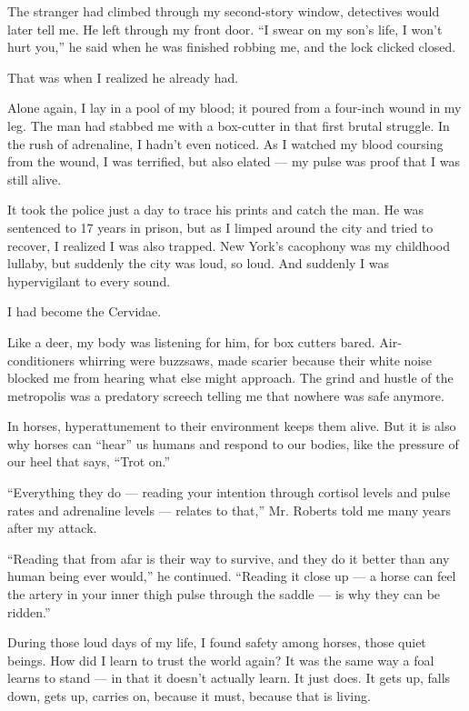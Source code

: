 The stranger had climbed through my second-story window, detectives
would later tell me. He left through my front door. ``I swear on my
son's life, I won't hurt you,'' he said when he was finished robbing me,
and the lock clicked closed.

That was when I realized he already had.

Alone again, I lay in a pool of my blood; it poured from a four-inch
wound in my leg. The man had stabbed me with a box-cutter in that first
brutal struggle. In the rush of adrenaline, I hadn't even noticed. As I
watched my blood coursing from the wound, I was terrified, but also
elated --- my pulse was proof that I was still alive.

It took the police just a day to trace his prints and catch the man. He
was sentenced to 17 years in prison, but as I limped around the city and
tried to recover, I realized I was also trapped. New York's cacophony
was my childhood lullaby, but suddenly the city was loud, so loud. And
suddenly I was hypervigilant to every sound.

I had become the Cervidae.

Like a deer, my body was listening for him, for box cutters bared.
Air-conditioners whirring were buzzsaws, made scarier because their
white noise blocked me from hearing what else might approach. The grind
and hustle of the metropolis was a predatory screech telling me that
nowhere was safe anymore.

In horses, hyperattunement to their environment keeps them alive. But it
is also why horses can ``hear'' us humans and respond to our bodies,
like the pressure of our heel that says, ``Trot on.''

``Everything they do --- reading your intention through cortisol levels
and pulse rates and adrenaline levels --- relates to that,'' Mr. Roberts
told me many years after my attack.

``Reading that from afar is their way to survive, and they do it better
than any human being ever would,'' he continued. ``Reading it close up
--- a horse can feel the artery in your inner thigh pulse through the
saddle --- is why they can be ridden.''

During those loud days of my life, I found safety among horses, those
quiet beings. How did I learn to trust the world again? It was the same
way a foal learns to stand --- in that it doesn't actually learn. It
just does. It gets up, falls down, gets up, carries on, because it must,
because that is living.

